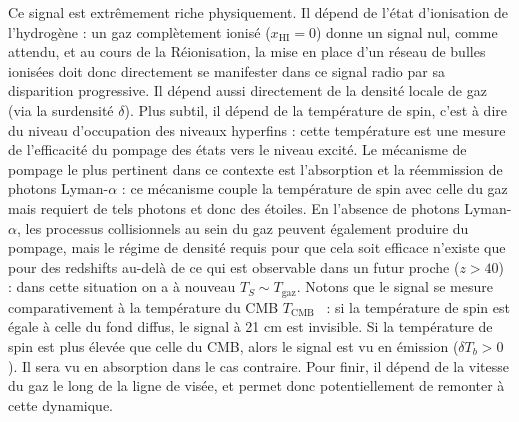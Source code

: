  Ce signal est extrêmement riche physiquement. Il dépend de l'état d'ionisation de l'hydrogène : un gaz complètement ionisé ($x_\mathrm{HI}=0$) donne un signal nul, comme attendu, et au cours de la Réionisation, la mise en place d'un réseau de bulles ionisées doit donc directement se manifester dans ce signal radio par sa disparition progressive. Il dépend aussi directement de la densité locale de gaz (via la surdensité $\delta$). Plus subtil, il dépend de la température de spin, c'est à dire du niveau d'occupation des niveaux hyperfins : cette température est une mesure de l'efficacité du pompage des états vers le niveau excité. Le mécanisme de pompage le plus pertinent dans ce contexte est l'absorption et la réemmission de photons Lyman-$\alpha$ : ce mécanisme couple la température de spin avec celle du gaz mais requiert de tels photons et donc des étoiles.  En l'absence de photons Lyman-$\alpha$, les processus collisionnels au sein du gaz peuvent également produire du pompage, mais le régime de densité requis pour que cela soit efficace n'existe que pour des redshifts au-delà de ce qui est observable dans un futur proche ($z>40$) : dans cette situation on a à nouveau $T_S\sim T_\mathrm{gaz}$. Notons que le signal se mesure comparativement à la température du CMB $T_\mathrm{CMB}$ ~: si la température de spin est égale à celle du fond diffus, le signal à 21 cm est invisible. Si la température de spin est plus élevée que celle du CMB, alors le signal est vu en émission ($\delta T_b >0$). Il sera vu en absorption dans le cas contraire. Pour finir, il dépend de la vitesse du gaz le long de la ligne de visée, et permet donc potentiellement de remonter à cette dynamique.

